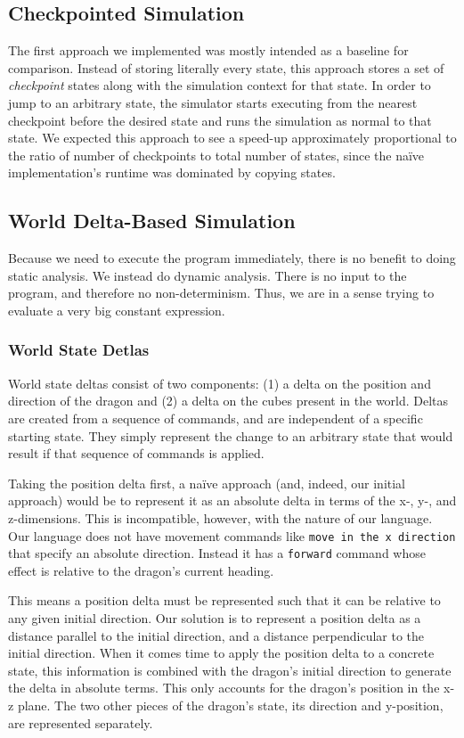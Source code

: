 \documentclass{sig-alternate}
\begin{document}
\subsection{Checkpointed Simulation}
The first approach we implemented was mostly intended as a baseline for comparison. Instead of storing literally every state, this approach stores a set of \emph{checkpoint} states along with the simulation context for that state. In order to jump to an arbitrary state, the simulator starts executing from the nearest checkpoint before the desired state and runs the simulation as normal to that state. We expected this approach to see a speed-up approximately proportional to the ratio of number of checkpoints to total number of states, since the na\"{i}ve implementation's runtime was dominated by copying states.

\subsection{World Delta-Based Simulation}
Because we need to execute the program immediately, there is no benefit to doing static analysis. We instead do dynamic analysis. There is no input to the program, and therefore no non-determinism. Thus, we are in a sense trying to evaluate a very big constant expression.

\subsubsection{World State Detlas}

World state deltas consist of two components: (1) a delta on the position and direction of the dragon and (2) a delta on the cubes present in the world. Deltas are created from a sequence of commands, and are independent of a specific starting state. They simply represent the change to an arbitrary state that would result if that sequence of commands is applied. 

Taking the position delta first, a na\"{i}ve approach (and, indeed, our initial approach) would be to represent it as an absolute delta in terms of the x-, y-, and z-dimensions. This is incompatible, however, with the nature of our language. Our language does not have movement commands like \texttt{move in the x direction} that specify an absolute direction. Instead it has a \texttt{forward} command whose effect is relative to the dragon's current heading. 

This means a position delta must be represented such that it can be relative to any given initial direction. Our solution is to represent a position delta as a distance parallel to the initial direction, and a distance perpendicular to the initial direction. When it comes time to apply the position delta to a concrete state, this information is combined with the dragon's initial direction to generate the delta in absolute terms. This only accounts for the dragon's position in the x-z plane. The two other pieces of the dragon's state, its direction and y-position, are represented separately. 
\end{document}
